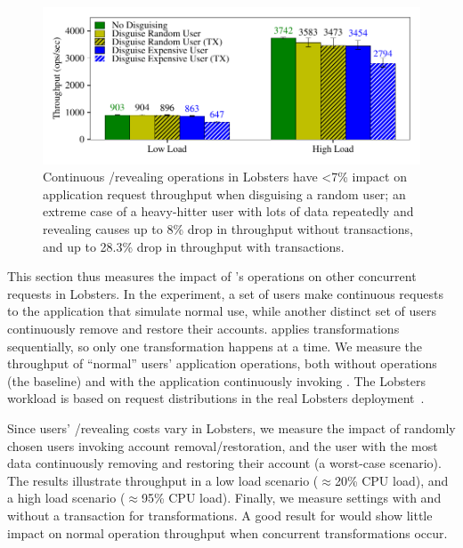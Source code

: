 \begin{figure}[t]
    \centering
    \includegraphics[width=\columnwidth]{figs/lobsters_concurrent_results}
    \caption[Impact of continuously disguising and revealing on
    application request throughput.]{Continuous \xxing/revealing operations in Lobsters
    have <7\% impact on application request throughput when disguising a
    random user; an extreme case of a heavy-hitter user with lots of data
    repeatedly \xxing and revealing causes up to 8\% drop in throughput without
    transactions, and up to 28.3\% drop in throughput with transactions.}
    \label{f:concurrent-lobsters}
\end{figure}


%
This section thus measures the impact of \sys's operations on other concurrent requests
in Lobsters.
%
In the experiment, a set of users make continuous requests to the
application that simulate normal use, while another distinct set of users
continuously remove and restore their accounts.
%
\sys applies \xxing transformations sequentially, so only one transformation
happens at a time.
%
%
We measure the throughput of ``normal'' users' application operations, both
without \sys operations (the baseline) and with the application continuously
invoking \sys.
%
The Lobsters workload is based on request distributions in the real
Lobsters deployment~\cite{lobsters-data}.
%

%
Since users' \xxing/revealing costs vary in Lobsters, we measure the
impact of \one{} randomly chosen users invoking account removal/restoration, and
\two{} the user with the most data continuously removing and restoring their
account (a worst-case scenario).
%
The results illustrate throughput in a low load scenario ($\approx$20\% CPU load),
and a high load scenario ($\approx$95\% CPU load).
%
Finally, we measure settings with and without a transaction for \sys
transformations.
%
%
A good result for \sys would show little impact on normal operation throughput
when concurrent \xxing transformations occur.
%

